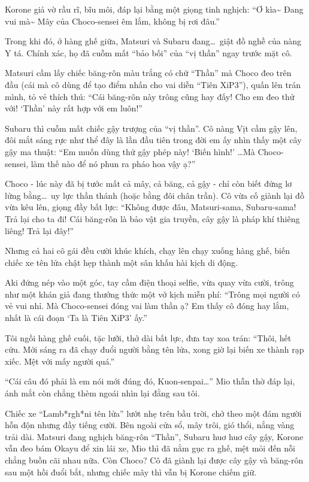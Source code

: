 \documentclass[../main.tex]{subfiles}
\begin{document}
Korone giả vờ rầu rĩ, bĩu môi, đáp lại bằng một giọng tinh nghịch: ``Ơ kìa\~{} Đang vui mà\~{} Mây của Choco-sensei êm lắm, không bị rơi đâu.''

Trong khi đó, ở hàng ghế giữa, Matsuri và Subaru đang\dots\ giật đồ nghề của nàng Y tá. Chính xác, họ đã cuỗm mất ``bảo bối'' của ``vị thần'' ngay trước mặt cô.

Matsuri cầm lấy chiếc băng-rôn màu trắng có chữ ``Thần'' mà Choco đeo trên đầu (cái mà cô dùng để tạo điểm nhấn cho vai diễn ``Tiên XiP3''), quấn lên trán mình, tỏ vẻ thích thú: ``Cái băng-rôn này trông cũng hay đấy! Cho em đeo thử với! `Thần' này rất hợp với em luôn!''

Subaru thì cuỗm mất chiếc gậy trượng của ``vị thần''. Cô nàng Vịt cầm gậy lên, đôi mắt sáng rực như thể đây là lần đầu tiên trong đời em ấy nhìn thấy một cây gậy ma thuật: ``Em muốn dùng thử gậy phép này! `Biến hình!' \dots Mà Choco-sensei, làm thế nào để nó phun ra pháo hoa vậy ạ?''

Choco - lúc này đã bị tước mất cả mây, cả băng, cả gậy - chỉ còn biết đứng lơ lửng bằng\dots\ uy lực thần thánh (hoặc bằng đôi chân trần). Cô vừa cố giành lại đồ vừa kêu lên, giọng đầy bất lực: ``Không được đâu, Matsuri-sama, Subaru-sama! Trả lại cho ta đi! Cái băng-rôn là bảo vật gia truyền, cây gậy là pháp khí thiêng liêng! Trả lại đây!''

Nhưng cả hai cô gái đều cười khúc khích, chạy lên chạy xuống hàng ghế, biến chiếc xe tên lửa chật hẹp thành một sân khấu hài kịch di động.

Aki đứng nép vào một góc, tay cầm điện thoại selfie, vừa quay vừa cười, trông như một khán giả đang thưởng thức một vở kịch miễn phí: ``Trông mọi người có vẻ vui nhỉ. Mà Choco-sensei đóng vai làm thần ạ? Em thấy cô đóng hay lắm, nhất là cái đoạn `Ta là Tiên XiP3' ấy.''

Tôi ngồi hàng ghế cuối, tặc lưỡi, thở dài bất lực, đưa tay xoa trán: ``Thôi, hết cứu. Mới sáng ra đã chạy đuổi người bằng tên lửa, xong giờ lại biến xe thành rạp xiếc. Mệt với mấy người quá.''

``Cái câu đó phải là em nói mới đúng đó, Kuon-senpai\dots'' Mio thẫn thờ đáp lại, ánh mắt còn chẳng thèm ngoái nhìn lại đằng sau tôi.

Chiếc xe ``Lamb*rgh*ni tên lửa'' lướt nhẹ trên bầu trời, chở theo một đám người hỗn độn nhưng đầy tiếng cười. Bên ngoài cửa sổ, mây trôi, gió thổi, nắng vàng trải dài. Matsuri đang nghịch băng-rôn ``Thần'', Subaru huơ huơ cây gậy, Korone vẫn đeo bám Okayu để xin lái xe, Mio thì đã nằm gục ra ghế, mệt mỏi đến nỗi chẳng buồn cãi nhau nữa. Còn Choco? Cô đã giành lại được cây gậy và băng-rôn sau một hồi đuổi bắt, nhưng chiếc mây thì vẫn bị Korone chiếm giữ.
\end{document}
